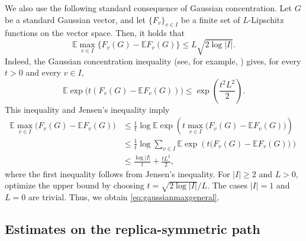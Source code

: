 \documentclass[11pt]{article}
\numberwithin{equation}{section}
\newcommand{\E}{\mathbb{E}}
\newcommand{\1}{\mathbf 1}
\begin{document}
We also use the following standard consequence of Gaussian concentration.
Let \(G\) be a standard Gaussian vector, and let $\{ F_v\} _{v\in I}$ be a finite set of $L$-Lipschitz functions on the vector space.
Then, it holds that
\begin{equation}
 \E\max_{v\in I}\{F_v (G) -\E F_v (G)\}
 \le L\sqrt{2\log|I|}.
 \label{eq:gaussianmaxgeneral}
\end{equation}
Indeed, the Gaussian concentration inequality (see, for example,
\cite{Ledoux}) gives, for every \(t>0\)
and every \(v\in I\),
\[
 \E\exp\bigl(t(F_v(G) -\E F_v (G))\bigr)
 \le \exp\left(\frac{t^2L^2}{2}\right).
\]
This inequality and Jensen's inequality imply
\[ \begin{aligned}
\E\max_{v\in I}\bigl(F_v(G)-\E F_v(G)\bigr) &\le \frac1t\log \E\exp\left( t\max_{v\in I}\bigl(F_v(G)-\E F_v(G)\bigr) \right)\\ &\le \frac1t\log \sum_{v\in I} \E\exp\left(t\bigl(F_v(G)-\E F_v(G)\bigr)\right)\\
&\le \frac{\log|I|}{t}+\frac{tL^2}{2}, \end{aligned} \] 
where the first inequality follows from Jensen's inequality. 
For $|I|\ge2$ and $L>0$, optimize the upper bound by choosing
$t=\sqrt{2\log|I|}/L$.  The cases $|I|=1$ and $L=0$ are trivial.
Thus, we obtain \eqref{eq:gaussianmaxgeneral}.

\subsection{Estimates on the replica-symmetric path}\label{subsec:ATsign}
\end{document}
